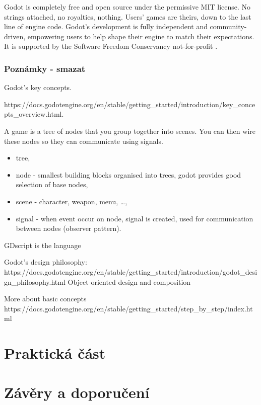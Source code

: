 		Godot is completely free and open source under the permissive MIT license. No strings attached, no royalties, nothing. Users' games are theirs, down to the last line of engine code. Godot's development is fully independent and community-driven, empowering users to help shape their engine to match their expectations. It is supported by the Software Freedom Conservancy not-for-profit \cite{godot_introduction} .

		\subsubsection{Poznámky - smazat}
		Godot's key concepts.

		https://docs.godotengine.org/en/stable/getting\_started/introduction/key\_concepts\_overview.html.

		A game is a tree of nodes that you group together into scenes. You can then wire these nodes so they can communicate using signals.

		\begin{itemize}
			\item tree,
			\item node - smallest building blocks organised into trees, godot provides good selection of base nodes,
			\item scene - character, weapon, menu, \ldots,
			\item  signal - when event occur on node, signal is created, used for communication between nodes (observer pattern).
		\end{itemize}

		GDscript is the language

		Godot's design philosophy:
		https://docs.godotengine.org/en/stable/getting\_started/introduction/godot\_design\_philosophy.html
		Object-oriented design and composition

		More about basic concepts
		https://docs.godotengine.org/en/stable/getting\_started/step\_by\_step/index.html

\section{Praktická část}



\section{Závěry a doporučení}


